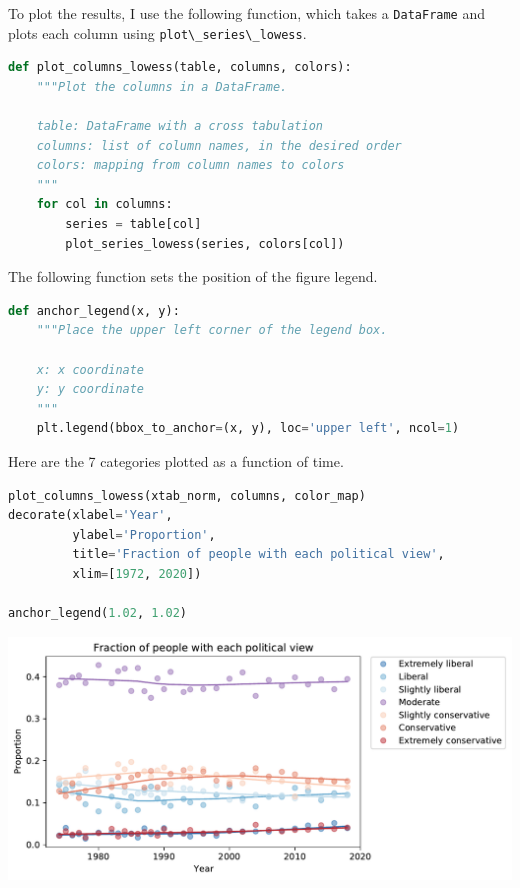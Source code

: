 To plot the results, I use the following function, which takes a
\passthrough{\lstinline!DataFrame!} and plots each column using
\passthrough{\lstinline!plot\_series\_lowess!}.

\begin{lstlisting}[language=Python]
def plot_columns_lowess(table, columns, colors):
    """Plot the columns in a DataFrame.
    
    table: DataFrame with a cross tabulation
    columns: list of column names, in the desired order
    colors: mapping from column names to colors
    """
    for col in columns:
        series = table[col]
        plot_series_lowess(series, colors[col])
\end{lstlisting}

The following function sets the position of the figure legend.

\begin{lstlisting}[language=Python]
def anchor_legend(x, y):
    """Place the upper left corner of the legend box.
    
    x: x coordinate
    y: y coordinate
    """
    plt.legend(bbox_to_anchor=(x, y), loc='upper left', ncol=1)
\end{lstlisting}

Here are the 7 categories plotted as a function of time.

\begin{lstlisting}[language=Python]
plot_columns_lowess(xtab_norm, columns, color_map)
decorate(xlabel='Year',
         ylabel='Proportion',
         title='Fraction of people with each political view',
         xlim=[1972, 2020])

anchor_legend(1.02, 1.02)
\end{lstlisting}

\begin{center}
\includegraphics[scale=0.75]{02_polviews_files/02_polviews_87_0.pdf}
\end{center}


